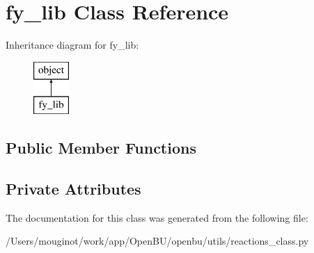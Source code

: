 \hypertarget{classopenbu_1_1utils_1_1reactions__class_1_1fy__lib}{}\section{fy\+\_\+lib Class Reference}
\label{classopenbu_1_1utils_1_1reactions__class_1_1fy__lib}
Inheritance diagram for fy\+\_\+lib\+:\begin{figure}[H]
\begin{center}
\leavevmode
\includegraphics[height=2.000000cm]{classopenbu_1_1utils_1_1reactions__class_1_1fy__lib}
\end{center}
\end{figure}
\subsection*{Public Member Functions}
\subsection*{Private Attributes}


The documentation for this class was generated from the following file\+:\begin{DoxyCompactItemize}
\item 
/\+Users/mouginot/work/app/\+Open\+B\+U/openbu/utils/reactions\+\_\+class.\+py\end{DoxyCompactItemize}
